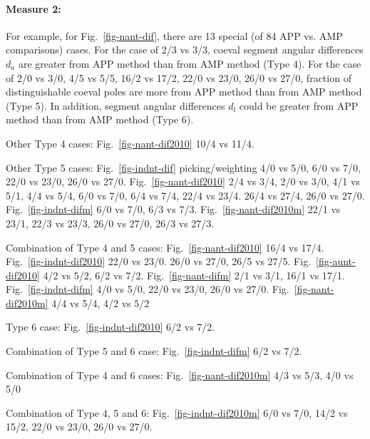 \paragraph{Measure 2:}

For example, for Fig.~\ref{fig-nant-dif}, there are 13 special (of 84 APP vs.
AMP comparisons) cases. For the case of 2/3 vs 3/3, coeval segment angular
differences $d_a$ are greater from APP method than from AMP method (Type 4). For
the case of 2/0 vs 3/0, 4/5 vs 5/5, 16/2 vs 17/2, 22/0 vs
23/0, 26/0 vs 27/0, fraction of
distinguishable coeval poles are more from APP method than from AMP method (Type
5). In addition, segment angular differences $d_l$ could be greater from APP
method than from AMP method (Type 6).

Other Type 4 cases: Fig.~\ref{fig-nant-dif2010} 10/4 vs 11/4.

Other Type 5 cases: Fig.~\ref{fig-indnt-dif} picking/weighting 4/0
vs 5/0, 6/0 vs 7/0, 22/0 vs
23/0, 26/0 vs 27/0.
Fig.~\ref{fig-nant-dif2010} 2/4 vs 3/4, 2/0
vs 3/0, 4/1 vs 5/1, 4/4 vs 5/4, 6/0 vs 7/0,
6/4 vs 7/4, 22/4 vs 23/4. 26/4 vs 27/4, 26/0 vs 27/0.
Fig.~\ref{fig-indnt-difm} 6/0 vs 7/0, 6/3 vs
7/3. Fig.~\ref{fig-nant-dif2010m} 22/1 vs 23/1, 22/3 vs
23/3, 26/0 vs 27/0, 26/3 vs
27/3.

Combination of Type 4 and 5 cases: Fig.~\ref{fig-nant-dif2010} 16/4 vs 17/4.
Fig.~\ref{fig-indnt-dif2010} 22/0 vs 23/0.
26/0 vs 27/0, 26/5 vs 27/5. Fig.~\ref{fig-aunt-dif2010}
4/2 vs 5/2, 6/2 vs 7/2. Fig.~\ref{fig-nant-difm} 2/1 vs 3/1, 16/1 vs
17/1. Fig.~\ref{fig-indnt-difm} 4/0 vs 5/0,
22/0 vs 23/0, 26/0 vs 27/0.
Fig.~\ref{fig-nant-dif2010m} 4/4 vs 5/4, 4/2 vs 5/2

Type 6 case: Fig.~\ref{fig-indnt-dif2010} 6/2 vs 7/2.

Combination of Type 5 and 6 case: Fig.~\ref{fig-indnt-difm} 6/2 vs 7/2.

Combination of Type 4 and 6 cases: Fig.~\ref{fig-nant-dif2010m} 4/3 vs 5/3, 4/0
vs 5/0

Combination of Type 4, 5 and 6: Fig.~\ref{fig-indnt-dif2010m} 6/0 vs
7/0, 14/2 vs 15/2, 22/0 vs 23/0,
26/0 vs 27/0.

